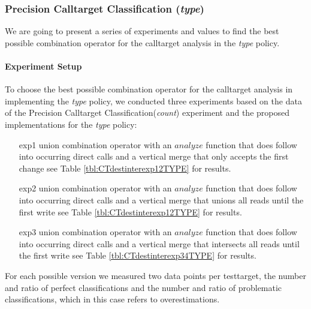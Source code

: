 %
%


\newpage
\subsubsection{Precision Calltarget Classification (\textit{type})}
\label{subsection:typeshieldprecision}
We are going to present a series of experiments and values to find the best possible combination operator for the calltarget analysis in the \textit{type} policy.
\paragraph{Experiment Setup}
To choose the best possible combination operator for the calltarget analysis in implementing the \textit{type} policy, we conducted three experiments based on the data of the Precision Calltarget Classification(\textit{count}) experiment and the proposed implementations for the \textit{type} policy:
\begin{enumerate}
\item[exp1] union combination operator with an $analyze$ function that does follow into occurring direct calls and a vertical merge that only accepts the first change see Table \ref{tbl:CTdestinterexp12TYPE} for results.
\item[exp2] union combination operator with an $analyze$ function that does follow into occurring direct calls  and a vertical merge that unions all reads until the first write see Table \ref{tbl:CTdestinterexp12TYPE} for results.
\item[exp3] union combination operator with an $analyze$ function that does follow into occurring direct calls  and a vertical merge that intersects all reads until the first write see Table \ref{tbl:CTdestinterexp34TYPE} for results.
\end{enumerate}
For each possible version we measured two data points per testtarget, the number and ratio of perfect classifications and the number and ratio of problematic classifications, which in this case refers to overestimations.
